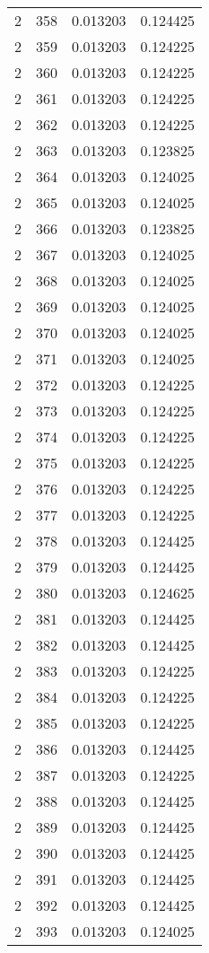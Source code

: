\begin{longtable}{rrrr}
2 & 358 & 0.013203 & 0.124425 \\
2 & 359 & 0.013203 & 0.124225 \\
2 & 360 & 0.013203 & 0.124225 \\
2 & 361 & 0.013203 & 0.124225 \\
2 & 362 & 0.013203 & 0.124225 \\
2 & 363 & 0.013203 & 0.123825 \\
2 & 364 & 0.013203 & 0.124025 \\
2 & 365 & 0.013203 & 0.124025 \\
2 & 366 & 0.013203 & 0.123825 \\
2 & 367 & 0.013203 & 0.124025 \\
2 & 368 & 0.013203 & 0.124025 \\
2 & 369 & 0.013203 & 0.124025 \\
2 & 370 & 0.013203 & 0.124025 \\
2 & 371 & 0.013203 & 0.124025 \\
2 & 372 & 0.013203 & 0.124225 \\
2 & 373 & 0.013203 & 0.124225 \\
2 & 374 & 0.013203 & 0.124225 \\
2 & 375 & 0.013203 & 0.124225 \\
2 & 376 & 0.013203 & 0.124225 \\
2 & 377 & 0.013203 & 0.124225 \\
2 & 378 & 0.013203 & 0.124425 \\
2 & 379 & 0.013203 & 0.124425 \\
2 & 380 & 0.013203 & 0.124625 \\
2 & 381 & 0.013203 & 0.124425 \\
2 & 382 & 0.013203 & 0.124425 \\
2 & 383 & 0.013203 & 0.124225 \\
2 & 384 & 0.013203 & 0.124225 \\
2 & 385 & 0.013203 & 0.124225 \\
2 & 386 & 0.013203 & 0.124425 \\
2 & 387 & 0.013203 & 0.124225 \\
2 & 388 & 0.013203 & 0.124425 \\
2 & 389 & 0.013203 & 0.124425 \\
2 & 390 & 0.013203 & 0.124425 \\
2 & 391 & 0.013203 & 0.124425 \\
2 & 392 & 0.013203 & 0.124425 \\
2 & 393 & 0.013203 & 0.124025 \\

\end{longtable}
